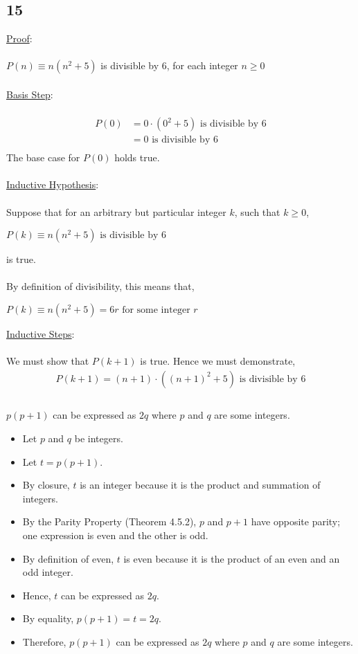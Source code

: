 \documentclass[12pt]{article}
\newcommand{\xlist}[1]{
    \begin{itemize}
        \renewcommand{\labelitemi}{$\centerdot$}
        #1
    \end{itemize}
    \newblock
    \\ \\
}
\newcommand{\xproof}[1]{
    \underline{Proof}:
    \\ \\
    #1
    \\ \\
}
\newcommand{\xbasisstep}{
    \underline{Basis Step}:
    \\ \\
}
\newcommand{\xinductivehypothesis}{
    \underline{Inductive Hypothesis}:
    \\ \\
}
\newcommand{\xinductivestep}{
    \underline{Inductive Steps}:
    \\ \\
}
\begin{document}
\subsection*{15}
\xproof{$P(n) \equiv n(n^2+5)$ is divisible by 6, for each integer $n \geq 0$}
\xbasisstep
\begin{align*}
  P(0) &= 0\cdot(0^2+5) \text{ is divisible by 6} \\
  &= 0 \text{ is divisible by 6} \\
\end{align*}
The base case for $P(0)$ holds true.
\\ \\
\xinductivehypothesis
Suppose that for an arbitrary but particular integer $k$, such that $k \geq 0$,
\begin{center}
  $P(k) \equiv n(n^2+5) \text{ is divisible by 6}$
\end{center}
is true. \\ \\
By definition of divisibility, this means that,
\begin{center}
  $P(k) \equiv n(n^2+5) = 6r \text{ for some integer }r$
\end{center}
\xinductivestep
We must show that $P(k+1)$ is true. Hence we must demonstrate,
\begin{align*}
  P(k+1) = (n+1)\cdot((n+1)^2 + 5) \text{ is divisible by 6} \\
\end{align*}
\newblock
\\
$p(p+1)$ can be expressed as $2q$ where $p$ and $q$ are some integers.
\xlist{
  \item Let $p$ and $q$ be integers.
  \item Let $t = p(p+1)$.
  \item By closure, $t$ is an integer because it is the product and summation of integers.
  \item By the Parity Property (Theorem 4.5.2), $p$ and $p+1$ have opposite parity; one expression is even and the other is odd.
  \item By definition of even, $t$ is even because it is the product of an even and an odd integer.
  \item Hence, $t$ can be expressed as $2q$.
  \item By equality, $p(p+1) = t = 2q$.
  \item Therefore, $p(p+1)$ can be expressed as $2q$ where $p$ and $q$ are some integers.
}
\\ \\
\end{document}

